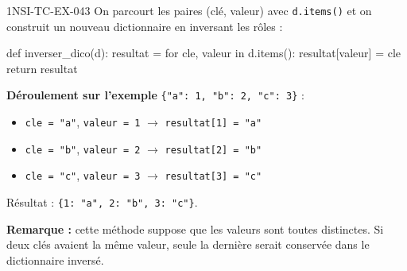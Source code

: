 \begin{corrige}{1NSI-TC-EX-043}
On parcourt les paires (clé, valeur) avec \lstinline{d.items()} et on construit un nouveau dictionnaire en inversant les rôles :

\begin{python}
def inverser_dico(d):
    resultat = {}
    for cle, valeur in d.items():
        resultat[valeur] = cle
    return resultat
\end{python}

\textbf{Déroulement sur l'exemple} \lstinline|{"a": 1, "b": 2, "c": 3}| :
\begin{itemize}
  \item \lstinline{cle = "a"}, \lstinline{valeur = 1} $\to$ \lstinline{resultat[1] = "a"}
  \item \lstinline{cle = "b"}, \lstinline{valeur = 2} $\to$ \lstinline{resultat[2] = "b"}
  \item \lstinline{cle = "c"}, \lstinline{valeur = 3} $\to$ \lstinline{resultat[3] = "c"}
\end{itemize}

Résultat : \lstinline|{1: "a", 2: "b", 3: "c"}|.

\textbf{Remarque :} cette méthode suppose que les valeurs sont toutes distinctes. Si deux clés avaient la même valeur, seule la dernière serait conservée dans le dictionnaire inversé.
\end{corrige}
